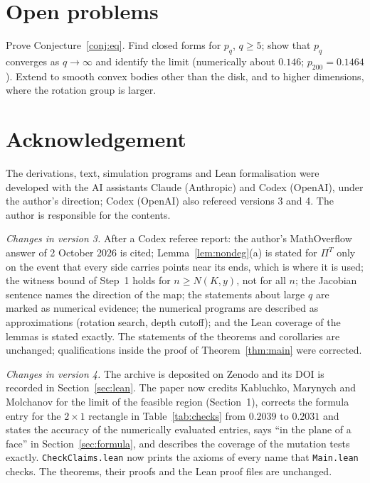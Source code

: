 \documentclass[11pt]{amsart}
\theoremstyle{remark}\newtheorem{remark}[theorem]{Remark}
\begin{document}
\section{Open problems}
Prove Conjecture~\ref{conj:eq}. Find closed forms for $p_q$, $q\ge5$; show that $p_q$ converges as $q\to\infty$ and identify the limit
(numerically about $0.146$; $p_{200}=0.1464$). Extend to
smooth convex bodies other than the disk, and to higher dimensions, where the rotation group is larger.

\section*{Acknowledgement}
The derivations, text, simulation programs and Lean formalisation were developed with the AI assistants Claude
(Anthropic) and Codex (OpenAI), under the author's direction; Codex (OpenAI) also refereed versions 3 and 4. The
author is responsible for the contents.

\emph{Changes in version 3.} After a Codex referee report: the author's MathOverflow answer of 2 October 2026 is
cited; Lemma~\ref{lem:nondeg}(a) is stated for $\Pi^T$ only on the event that every side carries points near its
ends, which is where it is used; the witness bound of Step~1 holds for $n\ge N(K,y)$, not for all $n$; the Jacobian
sentence names the direction of the map; the statements about large $q$ are marked as numerical evidence; the
numerical programs are described as approximations (rotation search, depth cutoff); and the Lean coverage of the
lemmas is stated exactly. The statements of the theorems and corollaries are unchanged; qualifications inside the proof
of Theorem~\ref{thm:main} were corrected.

\emph{Changes in version 4.} The archive is deposited on Zenodo and its DOI is recorded in Section~\ref{sec:lean}.
The paper now credits Kabluchko, Marynych and Molchanov \cite{kmm} for the
limit of the feasible region (Section~1), corrects the formula entry for the $2\times1$ rectangle in Table~\ref{tab:checks} from $0.2039$
to $0.2031$ and states the accuracy of the numerically evaluated entries, says ``in the plane of a face'' in
Section~\ref{sec:formula}, and describes the coverage of the mutation tests exactly. \texttt{CheckClaims.lean} now prints the axioms
of every name that \texttt{Main.lean} checks. The theorems, their proofs and the Lean proof files are unchanged.
\end{document}
